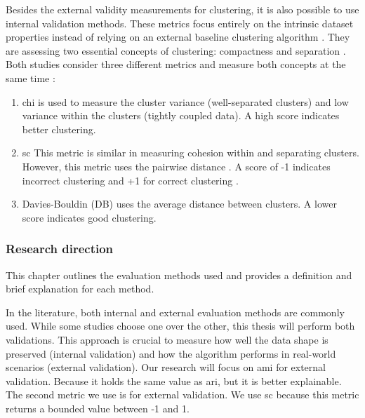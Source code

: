 Besides the external validity measurements for clustering, it is also possible to use internal validation methods.
These metrics focus entirely on the intrinsic dataset properties instead of relying on an external baseline clustering algorithm \citep{craenendonck_using_nodate}.
They are assessing two essential concepts of clustering: compactness and separation \citep{hassani_using_2017}.
Both studies consider three different metrics and measure both concepts at the same time \citep{hassani_using_2017}:
\begin{enumerate}
  \item \gls{chi} \citep{calinski_dendrite_1974} is used to measure the cluster variance (well-separated clusters) and low variance within the clusters (tightly coupled data). A high score indicates better clustering.
  \item \gls{sc} \citep{rousseeuw_silhouettes_1987} This metric is similar in measuring cohesion within and separating clusters.
        However, this metric uses the pairwise distance \citep{hassani_using_2017}.
        A score of -1 indicates incorrect clustering and +1 for correct clustering \citep{rousseeuw_silhouettes_1987}.
  \item Davies-Bouldin (DB) \citep{davies_cluster_1979} uses the average distance between clusters. A lower score indicates good clustering.
\end{enumerate}


\subsubsection{Research direction}
This chapter outlines the evaluation methods used and provides a definition and brief explanation for each method.

In the literature, both internal and external evaluation methods are commonly used.
While some studies choose one over the other, this thesis will perform both validations.
This approach is crucial to measure how well the data shape is preserved (internal validation) and how the algorithm performs in real-world scenarios (external validation).
Our research will focus on \gls{ami} for external validation. Because it holds the same value as \gls{ari}, but it is better explainable.
The second metric we use is for external validation. We use \gls{sc} because this metric returns a bounded value between -1 and 1.

